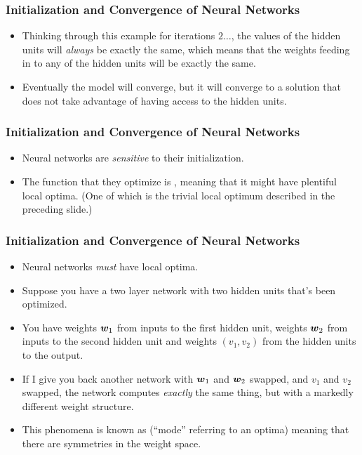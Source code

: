 \documentclass[trans]{beamer}
\begin{document}
\begin{frame}
  \frametitle{Initialization and Convergence of Neural Networks}
\begin{itemize} 
\item Thinking through
this example for iterations $2\dots$, the values of the hidden units
will \emph{always} be exactly the same, which means that the weights
feeding in to any of the hidden units will be exactly the same.
\item
Eventually the model will converge, but it will converge to a solution
that does not take advantage of having access to the hidden units.
\end{itemize}
\end{frame}

\begin{frame}
  \frametitle{Initialization and Convergence of Neural Networks}
\begin{itemize}
\item
Neural networks are \emph{sensitive} to their
initialization.
\item The function that they optimize is
, meaning that it might have plentiful local
optima.  (One of which is the trivial local optimum described in the
preceding slide.)  
\end{itemize}
\end{frame}

\begin{frame}
  \frametitle{Initialization and Convergence of Neural Networks}
\begin{itemize}
\item Neural networks \emph{must} have
local optima.  
\item Suppose you have a two layer network with two hidden
units that's been optimized. 
\item You have weights ${\boldsymbol{w}}_1$ from inputs to
the first hidden unit, weights ${\boldsymbol{w}}_2$ from inputs to the second
hidden unit and weights $(v_1,v_2)$ from the hidden units to the
output.
\item  If I give you back another network with ${\boldsymbol{w}}_1$ and ${\boldsymbol{w}}_2$
swapped, and $v_1$ and $v_2$ swapped, the network computes
\emph{exactly} the same thing, but with a markedly different weight
structure. 
\item This phenomena is known as 
(``mode'' referring to an optima) meaning that there are symmetries in
the weight space. 
\end{itemize}
\end{frame}
\end{document}
